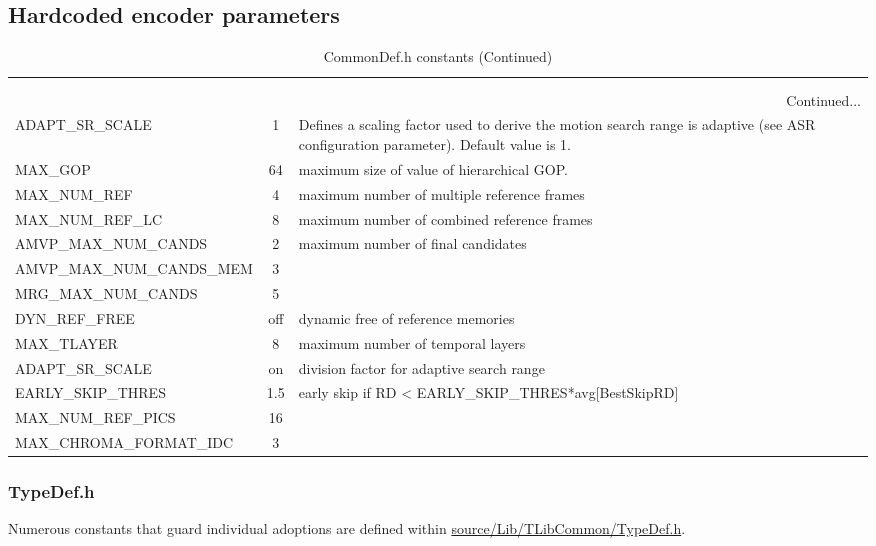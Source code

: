 \documentclass[a4paper,11pt]{jvetdoc}
\makeatletter
\newcommand{\Option}[1]{\ifx\optOption\@empty\gdef\optOption{#1}\else\g@addto@macro\optOption{ \\ #1}\fi}
\newcommand{\Default}[1]{\ifx\optDefault\@empty\gdef\optDefault{#1}\else\g@addto@macro\optDefault{ \\ #1}\fi}
\newcommand{\clearOptions}{\gdef\optOption{}\gdef\optShortOption{}\gdef\optDefault{}}
\newenvironment{MacroTable}[1]{%
	\scriptsize
	\def\arraystretch{1.3}
	\clearOptions
	\begin{longtable}{lcp{0.5\textwidth}}
	 \caption{#1} \\
	 \hline
	  \thead{Option} &
	  \thead{Default} &
	  \thead{Description} \\
	 \hline
	\endfirsthead
	 \caption[]{#1 (Continued)} \\
	 \hline
	  \thead{Option} &
	  \thead{Default} &
	  \thead{Description} \\
	 \hline
	\endhead
	 \multicolumn{3}{r}{Continued...}\\
	 \hline
	\endfoot
	 \hline
	\endlastfoot
}{%
	\end{longtable}
}
\makeatother
\begin{document}

\subsection{Hardcoded encoder parameters}
\begin{MacroTable}{CommonDef.h constants}
ADAPT_SR_SCALE &
1 &
Defines a scaling factor used to derive the motion search range is
adaptive (see ASR configuration parameter). Default value is 1.
\\

MAX_GOP &
64 &
maximum size of value of hierarchical GOP.
\\

MAX_NUM_REF &
4 &
maximum number of multiple reference frames
\\

MAX_NUM_REF_LC &
8 &
maximum number of combined reference frames
\\

AMVP_MAX_NUM_CANDS &
2 &
maximum number of final candidates
\\

AMVP_MAX_NUM_CANDS_MEM &
3 &
\\

MRG_MAX_NUM_CANDS &
5 &
\\

DYN_REF_FREE &
off &
dynamic free of reference memories
\\

MAX_TLAYER &
8 &
maximum number of temporal layers
\\

ADAPT_SR_SCALE &
on &
division factor for adaptive search range
\\

EARLY_SKIP_THRES &
1.5 &
early skip if RD < EARLY_SKIP_THRES*avg[BestSkipRD]
\\

MAX_NUM_REF_PICS &
16 &
\\

MAX_CHROMA_FORMAT_IDC &
3 &
\\
\end{MacroTable}

\subsubsection*{TypeDef.h}
Numerous constants that guard individual adoptions are defined within
\url{source/Lib/TLibCommon/TypeDef.h}.
\end{document}

